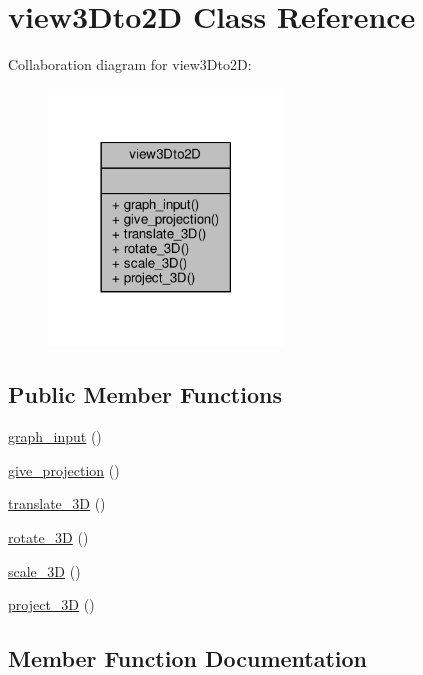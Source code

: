 \hypertarget{classview3Dto2D}{}\section{view3\+Dto2D Class Reference}
\label{classview3Dto2D}


Collaboration diagram for view3\+Dto2D\+:
\nopagebreak
\begin{figure}[H]
\begin{center}
\leavevmode
\includegraphics[width=177pt]{classview3Dto2D__coll__graph}
\end{center}
\end{figure}
\subsection*{Public Member Functions}
\begin{DoxyCompactItemize}
\item 
\hyperlink{classview3Dto2D_ab11291f6c3ea5835a15c069ce33c3f9f}{graph\+\_\+input} ()
\item 
\hyperlink{classview3Dto2D_ac598b0f02e0e892f63363ad33bd06ac0}{give\+\_\+projection} ()
\item 
\hyperlink{classview3Dto2D_a9d2c4326ea37b4020ab55e23133105fd}{translate\+\_\+3D} ()
\item 
\hyperlink{classview3Dto2D_a08491d952539c911a02489a500e8f830}{rotate\+\_\+3D} ()
\item 
\hyperlink{classview3Dto2D_a9f4eb503f1f50649fb38df348e1f836b}{scale\+\_\+3D} ()
\item 
\hyperlink{classview3Dto2D_a8b6a91f689534c80d15da1124d69e214}{project\+\_\+3D} ()
\end{DoxyCompactItemize}


\subsection{Member Function Documentation}
\mbox{\label{classview3Dto2D_ac598b0f02e0e892f63363ad33bd06ac0}} 
